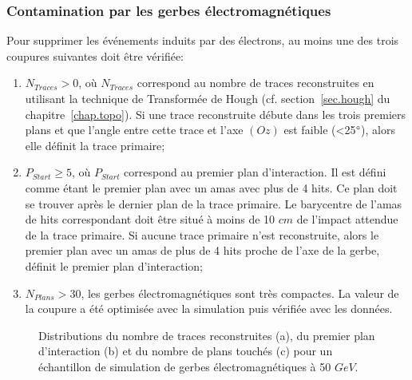 \subsubsection{Contamination par les gerbes électromagnétiques}
Pour supprimer les événements induits par des électrons, au moins une des trois coupures suivantes doit être vérifiée:
\begin{enumerate}[-]
\item $N_{Traces}>0$, où $N_{Traces}$ correspond au nombre de traces reconstruites en utilisant la technique de Transformée de Hough (cf. section~\ref{sec.hough} du chapitre~\ref{chap.topo}). Si une trace reconstruite débute dans les trois premiers plans et que l'angle entre cette trace et l'axe $(Oz)$ est faible (<25$\degree$), alors elle définit la trace primaire;
\item $P_{Start}\geq5$, où $P_{Start}$ correspond au premier plan d’interaction. Il est défini comme étant le premier plan avec un amas avec plus de 4 hits. Ce plan doit se trouver après le dernier plan de la trace primaire. Le barycentre de l'amas de hits correspondant doit être situé à moins de 10 $cm$ de l'impact attendue de la trace primaire. Si aucune trace primaire n'est reconstruite, alors le premier plan avec un amas de plus de 4 hits proche de l'axe de la gerbe, définit le premier plan d’interaction;
\item $N_{Plans}>30$, les gerbes électromagnétiques sont très compactes. La valeur de la coupure a été optimisée avec la simulation puis vérifiée avec les données.
\end{enumerate}
\begin{figure}[!ht]
  \caption{Distributions du nombre de traces reconstruites (a), du premier plan d'interaction (b) et du nombre de plans touchés (c) pour un échantillon de simulation de gerbes électromagnétiques à 50 $GeV$.\label{fig:electron_control}}
\end{figure}
